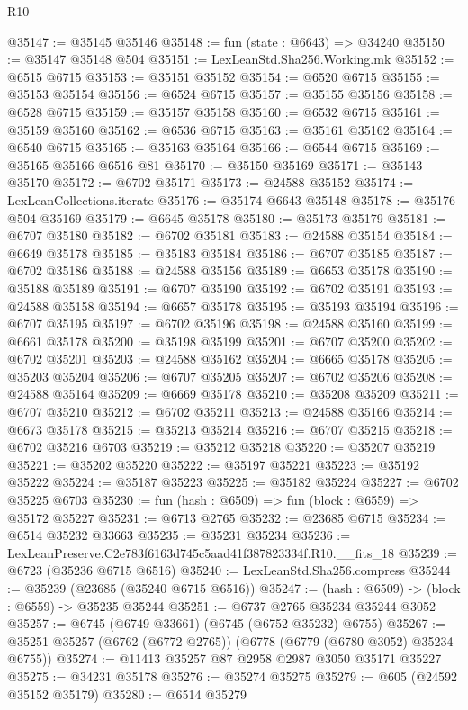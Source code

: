 \begin{lexlean}{R10}
\begin{coremodule}
@35147 := @35145 @35146
@35148 := fun (state : @6643) => @34240
@35150 := @35147 @35148 @504
@35151 := LexLeanStd.Sha256.Working.mk
@35152 := @6515 @6715
@35153 := @35151 @35152
@35154 := @6520 @6715
@35155 := @35153 @35154
@35156 := @6524 @6715
@35157 := @35155 @35156
@35158 := @6528 @6715
@35159 := @35157 @35158
@35160 := @6532 @6715
@35161 := @35159 @35160
@35162 := @6536 @6715
@35163 := @35161 @35162
@35164 := @6540 @6715
@35165 := @35163 @35164
@35166 := @6544 @6715
@35169 := @35165 @35166 @6516 @81
@35170 := @35150 @35169
@35171 := @35143 @35170
@35172 := @6702 @35171
@35173 := @24588 @35152
@35174 := LexLeanCollections.iterate
@35176 := @35174 @6643 @35148
@35178 := @35176 @504 @35169
@35179 := @6645 @35178
@35180 := @35173 @35179
@35181 := @6707 @35180
@35182 := @6702 @35181
@35183 := @24588 @35154
@35184 := @6649 @35178
@35185 := @35183 @35184
@35186 := @6707 @35185
@35187 := @6702 @35186
@35188 := @24588 @35156
@35189 := @6653 @35178
@35190 := @35188 @35189
@35191 := @6707 @35190
@35192 := @6702 @35191
@35193 := @24588 @35158
@35194 := @6657 @35178
@35195 := @35193 @35194
@35196 := @6707 @35195
@35197 := @6702 @35196
@35198 := @24588 @35160
@35199 := @6661 @35178
@35200 := @35198 @35199
@35201 := @6707 @35200
@35202 := @6702 @35201
@35203 := @24588 @35162
@35204 := @6665 @35178
@35205 := @35203 @35204
@35206 := @6707 @35205
@35207 := @6702 @35206
@35208 := @24588 @35164
@35209 := @6669 @35178
@35210 := @35208 @35209
@35211 := @6707 @35210
@35212 := @6702 @35211
@35213 := @24588 @35166
@35214 := @6673 @35178
@35215 := @35213 @35214
@35216 := @6707 @35215
@35218 := @6702 @35216 @6703
@35219 := @35212 @35218
@35220 := @35207 @35219
@35221 := @35202 @35220
@35222 := @35197 @35221
@35223 := @35192 @35222
@35224 := @35187 @35223
@35225 := @35182 @35224
@35227 := @6702 @35225 @6703
@35230 := fun (hash : @6509) => fun (block : @6559) => @35172 @35227
@35231 := @6713 @2765
@35232 := @23685 @6715
@35234 := @6514 @35232 @33663
@35235 := @35231 @35234
@35236 := LexLeanPreserve.C2e783f6163d745c5aad41f387823334f.R10.__fits_18
@35239 := @6723 (@35236 @6715 @6516)
@35240 := LexLeanStd.Sha256.compress
@35244 := @35239 (@23685 (@35240 @6715 @6516))
@35247 := (hash : @6509) -> (block : @6559) -> @35235 @35244
@35251 := @6737 @2765 @35234 @35244 @3052
@35257 := @6745 (@6749 @33661) (@6745 (@6752 @35232) @6755)
@35267 := @35251 @35257 (@6762 (@6772 @2765)) (@6778 (@6779 (@6780 @3052) @35234 @6755))
@35274 := @11413 @35257 @87 @2958 @2987 @3050 @35171 @35227
@35275 := @34231 @35178
@35276 := @35274 @35275
@35279 := @605 (@24592 @35152 @35179)
@35280 := @6514 @35279

\end{coremodule}
\end{lexlean}
